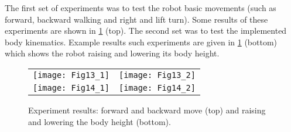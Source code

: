	The first set of experiments was to test the robot basic movements (such as forward, backward walking and right and lift turn). Some results of these experiments are shown in \ref{robot} (top). The second set was to test the implemented body kinematics. Example results such experiments are given in \ref{robot} (bottom) which shows the robot raising and lowering its body height.
	\begin{figure}[H]
		\centering
		\begin{tabular}{ l l }
			\texttt{[image: Fig13\_1]} & 
			\texttt{[image: Fig13\_2]} \\ 
			\texttt{[image: Fig14\_1]} & 
			\texttt{[image: Fig14\_2]} \\ 
		\end{tabular}
		\caption{Experiment results: forward and backward move (top) and raising and lowering the body height (bottom).}
		\label{robot}
	\end{figure}
	
	

